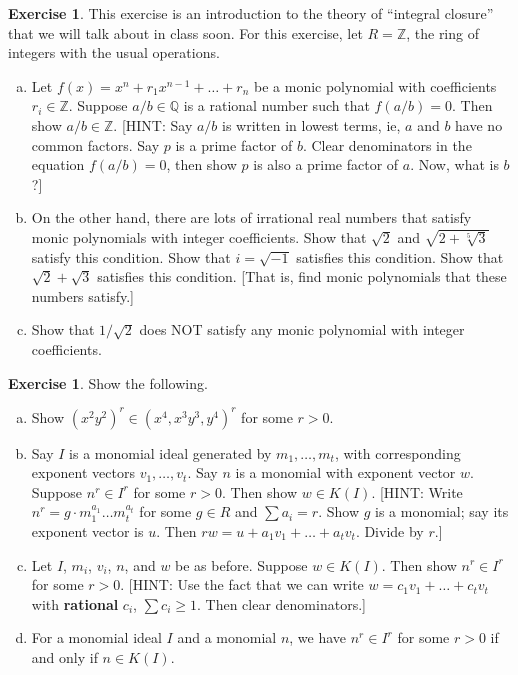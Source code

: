 \documentclass{amsart}
\theoremstyle{plain}
\theoremstyle{definition}
\newtheorem{exercise}[theorem]{Exercise}
\theoremstyle{definition}
\newcommand{\Z}{\mathbb{Z}}
\newcommand{\Q}{\mathbb{Q}}
\begin{document}
\begin{exercise}
This exercise is an introduction to the theory of ``integral closure'' that we will talk about
in class soon. For this exercise, let $R = \Z$, the ring of integers with the usual operations.
\begin{enumerate}[a.]
\item Let $f(x) = x^n + r_1 x^{n-1} + \dots + r_n$ be a monic polynomial with coefficients $r_i \in \Z$.
Suppose $a/b \in \Q$ is a rational number such that $f(a/b) = 0$.
Then show $a/b \in \Z$.
[HINT: Say $a/b$ is written in lowest terms, ie, $a$ and $b$ have no common factors.
Say $p$ is a prime factor of $b$. Clear denominators in the equation $f(a/b)=0$,
then show $p$ is also a prime factor of $a$. Now, what is $b$?]
\item On the other hand, there are lots of irrational real numbers that satisfy monic polynomials with
integer coefficients. Show that $\sqrt{2}$ and $\sqrt{2+\sqrt[5]{3}}$ satisfy this condition.
Show that $i = \sqrt{-1}$ satisfies this condition.
Show that $\sqrt{2}+\sqrt{3}$ satisfies this condition.
[That is, find monic polynomials that these numbers satisfy.]
\item Show that $1/\sqrt{2}$ does NOT satisfy any monic polynomial with integer coefficients.
\end{enumerate}
\end{exercise}


\begin{exercise}
Show the following.
\begin{enumerate}[a.]
\item Show $(x^2 y^2)^r \in (x^4,x^3 y^3, y^4)^r$ for some $r > 0$.
\item Say $I$ is a monomial ideal generated by $m_1, \dots, m_t$,
with corresponding exponent vectors $v_1, \dots, v_t$.
Say $n$ is a monomial with exponent vector $w$.
Suppose $n^r \in I^r$ for some $r > 0$.
Then show $w \in K(I)$.
[HINT: Write $n^r = g \cdot m_1^{a_1} \dots m_t^{a_t}$
for some $g \in R$ and $\sum a_i = r$.
Show $g$ is a monomial; say its exponent vector is $u$.
Then $rw = u + a_1 v_1 + \dots + a_t v_t$. Divide by $r$.]
\item Let $I$, $m_i$, $v_i$, $n$, and $w$ be as before.
Suppose $w \in K(I)$.
Then show $n^r \in I^r$ for some $r > 0$.
[HINT: Use the fact that we can write $w = c_1 v_1 + \dots + c_t v_t$
with \textbf{rational} $c_i$, $\sum c_i \geq 1$.
Then clear denominators.]
\item For a monomial ideal $I$ and a monomial $n$,
we have $n^r \in I^r$ for some $r > 0$
if and only if $n \in K(I)$.
\end{enumerate}
\end{exercise}
\end{document}
